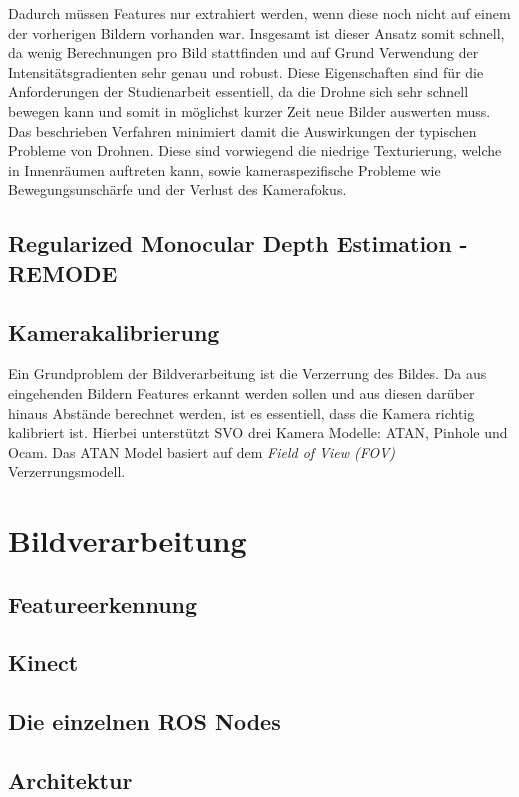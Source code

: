 Dadurch müssen Features nur extrahiert werden, wenn diese noch nicht auf einem der vorherigen Bildern vorhanden war. Insgesamt ist dieser Ansatz somit schnell, da wenig Berechnungen pro Bild stattfinden und auf Grund Verwendung der Intensitätsgradienten sehr genau und robust. \newline
Diese Eigenschaften sind für die Anforderungen der Studienarbeit essentiell, da die Drohne sich sehr schnell bewegen kann und somit in möglichst kurzer Zeit neue Bilder auswerten muss. Das beschrieben Verfahren minimiert damit die Auswirkungen der typischen Probleme von Drohnen. Diese sind vorwiegend die niedrige Texturierung, welche in Innenräumen auftreten kann, sowie kameraspezifische Probleme wie Bewegungsunschärfe und der Verlust des Kamerafokus.


\subsection{Regularized Monocular Depth Estimation - REMODE}



\subsection{Kamerakalibrierung}
Ein Grundproblem der Bildverarbeitung ist die Verzerrung des Bildes. Da aus eingehenden Bildern Features erkannt werden sollen und aus diesen darüber hinaus Abstände berechnet werden, ist es essentiell, dass die Kamera richtig kalibriert ist. \newline
Hierbei unterstützt SVO drei Kamera Modelle: ATAN, Pinhole und Ocam. \cite{svo_cameracalibration} \newline
Das ATAN Model basiert auf dem \textit{Field of View \emph{(FOV)}} Verzerrungsmodell. 



\section{Bildverarbeitung}
\label{Bildverarbeitung}

\subsection{Featureerkennung}
\subsection{Kinect}
\subsection{Die einzelnen ROS Nodes}
\subsection{Architektur}



